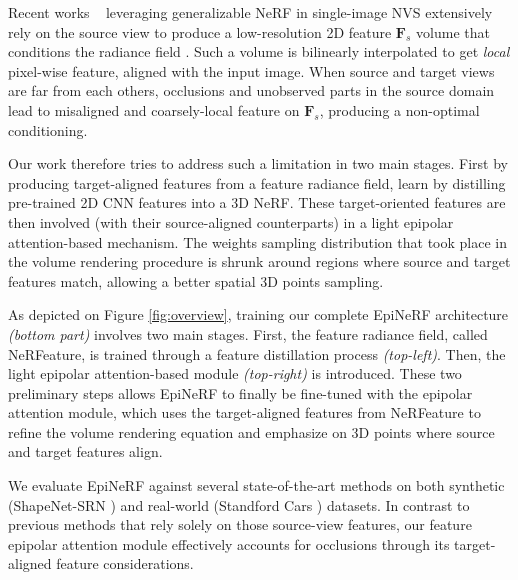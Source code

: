Recent works ~\cite{yu2021pixelnerf,li2022symmnerf,lin2023vision} leveraging generalizable NeRF in single-image NVS extensively rely on the source view to produce a low-resolution 2D feature $\textbf{F}_{s}$ volume that conditions the radiance field . Such a volume is bilinearly interpolated to get \textit{local} pixel-wise feature, aligned with the input image. When source and target views are far from each others, occlusions and unobserved parts in the source domain lead to misaligned and coarsely-local feature on $\textbf{F}_{s}$, producing a non-optimal conditioning. 

Our work therefore tries to address such a limitation in two main stages. First by producing target-aligned features from a feature radiance field, learn by distilling pre-trained 2D CNN features into a 3D NeRF. These target-oriented features are then involved (with their source-aligned counterparts) in a light epipolar attention-based mechanism. The weights sampling distribution that took place in the volume rendering procedure is shrunk around regions where source and target features match, allowing a better spatial 3D points sampling.

As depicted on Figure \ref{fig:overview},  training our complete EpiNeRF architecture \textit{(bottom part)} involves two main stages.  First, the feature radiance field, called NeRFeature, is trained through a feature distillation process \textit{(top-left)}. Then, the light epipolar attention-based module \textit{(top-right)} is introduced. These two preliminary steps allows EpiNeRF to finally be fine-tuned with the epipolar attention module, which uses the target-aligned features from NeRFeature to refine the volume rendering equation and emphasize on 3D points where source and target features align.
 
We evaluate EpiNeRF against several state-of-the-art methods on both synthetic (ShapeNet-SRN \cite{sitzmann2019scene}) and real-world (Standford Cars \cite{krause20133d}) datasets. In contrast to previous methods that rely solely on those source-view features, our feature epipolar attention module effectively accounts for occlusions through its target-aligned feature considerations. 

